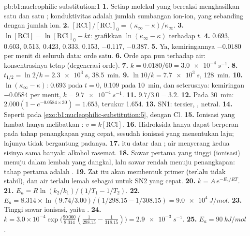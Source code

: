 \begin{solution}{pb:b1:nucleophilic-substitution:1}
\textbf{1.} Setiap molekul yang bereaksi menghasilkan satu  dan satu
; konduktivitas adalah jumlah sumbangan ion-ion, yang sebanding
dengan jumlah ion.
\textbf{2.} $[\mathrm{RCl}]/[\mathrm{RCl}]_0 = (\kappa_\infty -
\kappa)/\kappa_\infty$.
\textbf{3.} $\ln[\mathrm{RCl}] = \ln[\mathrm{RCl}]_0 - kt$: grafikkan
$\ln(\kappa_\infty - \kappa)$ terhadap $t$.
\textbf{4.} 0.693, 0.603, 0.513, 0.423, 0.333, 0.153, $-0.117$, $-0.387$.
\textbf{5.} Ya, kemiringannya $-0.0180$ per menit di seluruh data: orde
satu.
\textbf{6.} Orde apa pun terhadap air: konsentrasinya tetap
(degenerasi orde).
\textbf{7.} $k = 0.0180/60 = \qty{3.0e-4}{s^{-1}}$.
\textbf{8.} $t_{1/2} = \ln 2/k = \qty{2.3e3}{s}$, \qty{38.5}{min}.
\textbf{9.} $\ln 10/k = \qty{7.7e3}{s}$, \qty{128}{min}.
\textbf{10.} $\ln(\kappa_\infty - \kappa)$: 0.693 pada $t = 0$, 0.109
pada \qty{10}{min}, dan seterusnya: kemiringan $-0.0584$ per menit,
$k = \qty{9.7e-4}{s^{-1}}$.
\textbf{11.} $9.7/3.0 = 3.2$.
\textbf{12.} Pada \qty{30}{min}: $2.000(1 - e^{-0.0584 \times 30}) = 1.653$,
terukur 1.654.
\textbf{13.} SN1:  tersier, ,  netral.
\textbf{14.} Seperti pada \cref{exo:b1:nucleophilic-substitution:5}, dengan
Cl.
\textbf{15.} Ionisasi yang lambat hanya melibatkan : $v =
k[\mathrm{RCl}]$.
\textbf{16.} Hidroksida hanya dapat berperan pada tahap penangkapan yang
cepat, sesudah ionisasi yang menentukan laju; lajunya tidak bergantung
padanya.
\textbf{17.}  itu datar dan ; air menyerang kedua
sisinya sama banyak: alkohol rasemat.
\textbf{18.} Sawar pertama yang tinggi (ionisasi) menuju  dalam
lembah yang dangkal, lalu sawar rendah menuju penangkapan: tahap pertama
adalah .
\textbf{19.} Zat itu akan membentuk  primer (terlalu tidak
stabil), dan air terlalu lemah sebagai  untuk SN2 yang cepat.
\textbf{20.} $k = A\,e^{-E_a/RT}$.
\textbf{21.} $E_a = R\ln(k_2/k_1)/(1/T_1 - 1/T_2)$.
\textbf{22.} $E_a = 8.314 \times \ln(9.74/3.00)/(1/298.15 - 1/308.15) =
\qty{9.0e4}{J/mol}$.
\textbf{23.} Tinggi sawar ionisasi, yaitu .
\textbf{24.} $k = 3.0 \times 10^{-4} \exp\bigl(\frac{90\,000}{8.314}
(\frac{1}{298.15} - \frac{1}{318.15})\bigr) = \qty{2.9e-3}{s^{-1}}$.
\textbf{25.} \textbf{$E_a = \qty{90}{kJ/mol}$}.
\end{solution}
